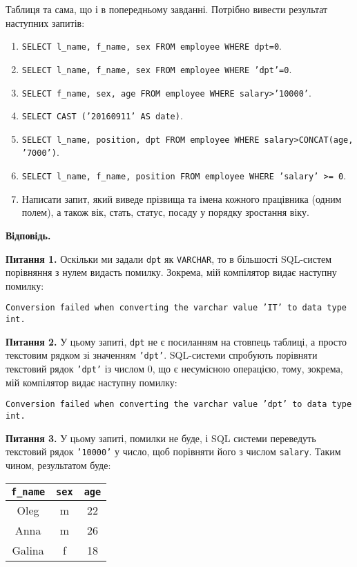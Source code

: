 \documentclass{hw_template}
\begin{document}
\begin{problem}
    Таблиця та сама, що і в попередньому завданні. Потрібно вивести результат
    наступних запитів:
    \begin{enumerate}
        \item \texttt{SELECT l\_name, f\_name, sex FROM employee WHERE dpt=0}.
        \item \texttt{SELECT l\_name, f\_name, sex FROM employee WHERE 'dpt'=0}.
        \item \texttt{SELECT f\_name, sex, age FROM employee WHERE salary>'10000'}.
        \item \texttt{SELECT CAST ('20160911' AS date)}.
        \item \texttt{SELECT l\_name, position, dpt FROM employee WHERE salary>CONCAT(age, '7000')}.
        \item \texttt{SELECT l\_name, f\_name, position FROM employee WHERE 'salary' >= 0}.
        \item Написати запит, який виведе прізвища та імена кожного працівника (одним полем), а
        також вік, стать, статус, посаду у порядку зростання віку.
    \end{enumerate}
\end{problem}

\textbf{Відповідь.}

\textbf{Питання 1.} Оскільки ми задали \texttt{dpt} як \texttt{VARCHAR}, то в більшості 
SQL-систем порівняння з нулем видасть помилку. Зокрема, мій компілятор видає наступну помилку:
\begin{center}
    \texttt{Conversion failed when converting the varchar value 'IT' to data type int.}
\end{center}

\textbf{Питання 2.} У цьому запиті, \texttt{dpt} не є посиланням на стовпець
таблиці, а просто текстовим рядком зі значенням \texttt{'dpt'}. SQL-системи
спробують порівняти текстовий рядок \texttt{'dpt'} із числом 0, що є несумісною
операцією, тому, зокрема, мій компілятор видає наступну помилку:
\begin{center}
    \texttt{Conversion failed when converting the varchar value 'dpt' to data type int.}
\end{center}

\textbf{Питання 3.} У цьому запиті, помилки не буде, і SQL системи переведуть 
текстовий рядок \texttt{'10000'} у число, щоб порівняти його з числом \texttt{salary}.
Таким чином, результатом буде:

\begin{table}[H]
    \centering
    \begin{tabular}{|c|c|c|}
        \hline
        \texttt{f\_name} & \texttt{sex} & \texttt{age} \\
        \hline
        Oleg & m & 22 \\
        Anna & m & 26 \\
        Galina & f & 18 \\
        \hline
    \end{tabular}
\end{table}
\end{document}
